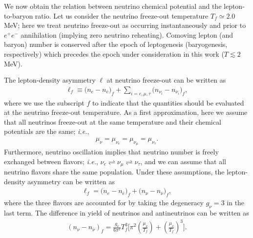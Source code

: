 We now obtain the relation between neutrino chemical potential and the lepton-to-baryon ratio. Let us consider the neutrino freeze-out temperature $T_f\simeq 2.0$\,MeV; here we treat neutrino freeze-out as occurring instantaneously and prior to $e^+e^-$ annihilation (implying zero neutrino reheating). Comoving lepton (and baryon) number is conserved after the epoch of leptogenesis (baryogenesis, respectively) which precedes the epoch under consideration in this work ($T\lesssim 2$\;MeV). 

The lepton-density asymmetry $\ell $ at neutrino freeze-out can be written as
\begin{align}
\ell_f \equiv\big(n_e-n_{\overline{e}}\big)_f+\sum_{i=e,\mu, \tau}\big(n_{\nu_i}-n_{\overline{\nu}_i}\big)_f,
\end{align}
where we use the subscript $f$ to indicate that the quantities should be evaluated at the neutrino freeze-out temperature. As a first approximation, here we assume that all neutrinos freeze-out at the same temperature and their chemical potentials are the same; {\it i.e.\/},
\begin{align}
\mu_\nu=\mu_{\nu_e}=\mu_{\nu_\mu}=\mu_{\nu_\tau}.
\end{align}
Furthermore, neutrino oscillation implies that neutrino number is freely exchanged between flavors; {\it i.e.\/}, $\nu_e\rightleftharpoons\nu_\mu\rightleftharpoons\nu_\tau$, and we can assume that all neutrino flavors share the same population. Under these assumptions, the lepton-density asymmetry can be written as
\begin{align}
\label{Lasymmetry} 
\ell_f=\big(n_e-n_{\overline{e}}\big)_f+\big(n_{\nu}-n_{\overline{\nu}}\big)_f,
\end{align}
where the three flavors are accounted for by taking the degeneracy $g_\nu=3$ in the last term. The difference in yield of neutrinos and antineutrinos can be written as
\begin{align}
\label{ExcessNeutrino}
\left(n_\nu-n_{\overline{\nu}}\right)_f=\frac{g_\nu}{6\pi^2}T^3_f\bigg[\pi^2\left(\frac{\mu_\nu}{T_f}\right)+\left(\frac{\mu_\nu}{T_f}\right)^{\!\!3}\bigg].
\end{align}


